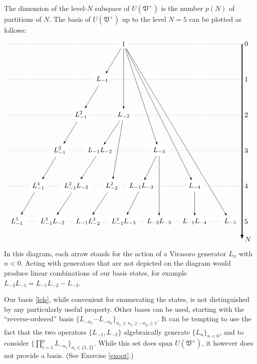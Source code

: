 \documentclass[12pt, a4paper, notitlepage, twoside]{report}
\numberwithin{equation}{section}
\theoremstyle{break}
\begin{document}
The dimension of the level-$N$ subspace of $U(\mathfrak{V}^+)$ is the number $p(N)$ of partitions of $N$.
The basis of $U(\mathfrak{V}^+)$ up to the level $N=5$ can be plotted as follows: 
\begin{align}
 \begin{tikzpicture}[scale = .3, baseline=(current  bounding  box.center)]
  \draw[-latex, very thick] (20, 0) -- (20, -33) node [right] {$N$};
  \foreach \x in {0, ..., 5}
  {
  \draw [dotted] (-20, {-6*\x}) -- (20, {-6*\x}) node [right] {${\x}$};
  }
  \node[fill = white] at (0, 0) (0) {$1$};
  \node[fill = white] at (-3.6,-6) (1) {$L_{-1}$};
  \node[fill = white] at (-7.2, -12) (11) {$L_{-1}^2$};
  \node[fill = white] at (-10.8, -18) (111) {$L_{-1}^3$};
  \node[fill = white] at (-14.4, -24) (1111) {$L_{-1}^4$};
  \node[fill = white] at (-18, -30) (11111) {$L_{-1}^5$};
  \node[fill = white] at (0,-12) (2) {$L_{-2}$};
  \node[fill = white] at (-4,-18) (12) {$L_{-1}L_{-2}$};
  \node[fill = white] at (-8,-24) (112) {$L_{-1}^2L_{-2}$};
  \node[fill = white] at (-12,-30) (1112) {$L_{-1}^3L_{-2}$};
  \node[fill = white] at (-2,-24) (22) {$L_{-2}^2$};
  \node[fill = white] at (-6,-30) (122) {$L_{-1}L_{-2}^2$};
  \node[fill = white] at (6,-18) (3) {$L_{-3}$};
  \node[fill = white] at (3,-24) (13) {$L_{-1}L_{-3}$};
  \node[fill = white] at (0,-30) (113) {$L_{-1}^2L_{-3}$};
  \node[fill = white] at (6,-30) (23) {$L_{-2}L_{-3}$};
  \node[fill = white] at (12,-24) (4) {$L_{-4}$};
  \node[fill = white] at (12,-30) (14) {$L_{-1}L_{-4}$};
  \node[fill = white] at (18,-30) (5) {$L_{-5}$};
  \draw[-latex] (0) -- (1);
  \draw[-latex] (1) -- (11);
  \draw[-latex] (11) -- (111);
  \draw[-latex] (111) -- (1111);
  \draw[-latex] (1111) -- (11111);
  \draw[-latex] (0) -- (2);
  \draw[-latex] (0) -- (3);
  \draw[-latex] (0) -- (4);
  \draw[-latex] (0) -- (5);
  \draw[-latex] (2) -- (12);
  \draw[-latex] (12) -- (112);
  \draw[-latex] (112) -- (1112);
  \draw[-latex] (2) -- (22);
  \draw[-latex] (22) -- (122);
  \draw[-latex] (3) -- (13);
  \draw[-latex] (13) -- (113);
  \draw[-latex] (4) -- (14);
  \draw[-latex] (3) -- (23);
 \end{tikzpicture}
\end{align}
In this diagram, each arrow stands for the action of a Virasoro generator $L_n$ with $n<0$.
Acting with generators that are not depicted on the diagram would produce linear combinations of our basis states, for example $L_{-2}L_{-1} = L_{-1}L_{-2} - L_{-3}$.

Our basis \eqref{lels}, while convenient for enumerating the states, is not distinguished by any particularly useful property.
Other bases can be used, starting with the ``reverse-ordered'' basis $\{ L_{-n_1} \cdots L_{-n_p} \}_{n_1\geq n_2\geq \cdots n_p\geq 1} $.
It can be tempting to use the fact that the two operators $\{L_{-1},L_{-2}\}$ algebraically generate $\{L_{n}\}_{n<0}$, and to consider $\{\prod_{i=1}^p L_{-n_i}\}_{n_i\in\{1,2\}}$.
While this set does span $U(\mathfrak{V}^+)$, it however does not provide a basis. (See Exercise \ref{exoot}.)
\end{document}
